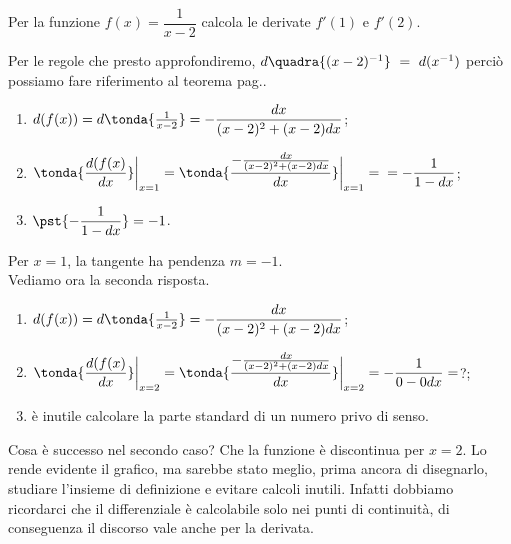 \begin{esempio}
 Per la funzione $f(x)=\dfrac{1}{x-2}$ calcola le derivate $f'(1)$ e 
$f'(2)$.\\
\begin{inaccessibleblock}
 \begin{center}
 \begin{minipage}[]{.40 \textwidth}
   \vspace{-.5em}
  \derivaomografica
 \end{minipage} 
 \hfill
 \begin{minipage}[]{.58 \textwidth}
   Per le regole che presto approfondiremo, 
$d\quadra{(x-2)^{-1}}~=~d(x^{-1})$
   perciò possiamo fare riferimento al teorema 
pag.\pageref{subsubsec:diff01_diffrecip}.
\begin{enumerate} [noitemsep]
 \item $d(f(x))=d\tonda {\frac{1}{x-2}}=-\dfrac{dx}{(x-2)^2+(x-2)dx}$;
 \item $\tonda{\dfrac{d(f(x)}{dx}}\bigg|_{x=1}=
  \tonda{\dfrac{-\frac{dx}{(x-2)^2+(x-2)dx}}{dx}}\bigg|_{x=1}=\\ 
  =-\dfrac{1}{1-dx}$;
  \item $\pst{-\dfrac{1}{1-dx}}=-1$.
\end{enumerate}
\end{minipage}
\end{center}
\end{inaccessibleblock}
\label{}

Per $x=1$, la tangente ha pendenza $m=-1$.\\
Vediamo ora la seconda risposta.
\begin{enumerate} [noitemsep]
 \item $d(f(x))=d\tonda {\frac{1}{x-2}}=-\dfrac{dx}{(x-2)^2+(x-2)dx}$;
 \item $\tonda{\dfrac{d(f(x)}{dx}}\bigg|_{x=2}=
  \tonda{\dfrac{-\frac{dx}{(x-2)^2+(x-2)dx}}{dx}}\bigg|_{x=2} 
  =-\dfrac{1}{0-0dx}=$?;
  \item è inutile calcolare la parte standard di un numero privo di senso.
\end{enumerate}
Cosa è successo nel secondo caso? Che la funzione è discontinua per $x=2$.
Lo rende evidente il grafico, ma sarebbe stato meglio, prima ancora di
disegnarlo, studiare l'insieme di definizione e evitare calcoli inutili.
Infatti dobbiamo ricordarci che il differenziale è calcolabile solo nei 
punti
di continuità, di conseguenza il discorso vale anche per la derivata.
\end{esempio}

